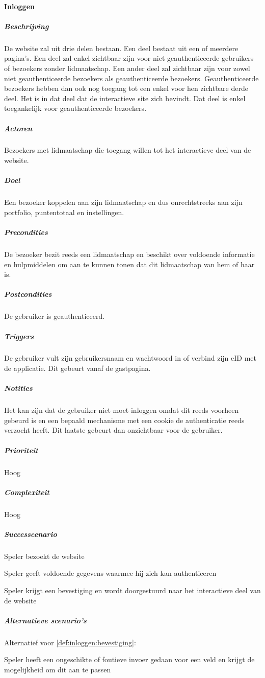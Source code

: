 \paragraph{Inloggen}
\begin{compact}
\subparagraph{Beschrijving} De website zal uit drie delen bestaan. Een deel bestaat uit een of meerdere pagina's. Een deel zal enkel zichtbaar zijn voor niet geauthenticeerde gebruikers of bezoekers zonder lidmaatschap. Een ander deel zal zichtbaar zijn voor zowel niet geauthenticeerde bezoekers als geauthenticeerde bezoekers. Geauthenticeerde bezoekers hebben dan ook nog toegang tot een enkel voor hen zichtbare derde deel. Het is in dat deel dat de interactieve site zich bevindt. Dat deel is enkel toegankelijk voor geauthenticeerde bezoekers.
\subparagraph{Actoren} Bezoekers met lidmaatschap die toegang willen tot het interactieve deel van de website.
\subparagraph{Doel} Een bezoeker koppelen aan zijn lidmaatschap en dus onrechtstreeks aan zijn portfolio, puntentotaal en instellingen.
\subparagraph{Precondities} De bezoeker bezit reeds een lidmaatschap en beschikt over voldoende informatie en hulpmiddelen om aan te kunnen tonen dat dit lidmaatschap van hem of haar is.
\subparagraph{Postcondities} De gebruiker is geauthenticeerd.
\subparagraph{Triggers} De gebruiker vult zijn gebruikersnaam en wachtwoord in of verbind zijn eID met de applicatie. Dit gebeurt vanaf de gastpagina.
\subparagraph{Notities} Het kan zijn dat de gebruiker niet moet inloggen omdat dit reeds voorheen gebeurd is en een bepaald mechanisme met een cookie de authenticatie reeds verzocht heeft. Dit laatste gebeurt dan onzichtbaar voor de gebruiker.
\subparagraph{Prioriteit}Hoog
\subparagraph{Complexiteit}Hoog
\subparagraph{Successcenario}
\begin{enumerate_compact}
 \item Speler bezoekt de website
 \item Speler geeft voldoende gegevens waarmee hij zich kan authenticeren
 \item \label{def:inloggen:bevestiging} Speler krijgt een bevestiging en wordt doorgestuurd naar het interactieve deel van de website
\end{enumerate_compact}
\subparagraph{Alternatieve scenario's}
Alternatief voor \ref{def:inloggen:bevestiging}:
\begin{enumerate_compact}
 \item Speler heeft een ongeschikte of foutieve invoer gedaan voor een veld en krijgt de mogelijkheid om dit aan te passen
\end{enumerate_compact}
\end{compact}

